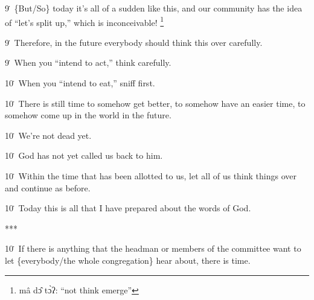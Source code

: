 9\. \{But/So\} today it's all of a sudden like this, and our community has the
idea of ``let's split up,'' which is inconceivable! \footnote{mâ dɔ̂ tɔ̀ʔ: ``not think emerge''}

9\. Therefore, in the future everybody should think this over carefully.

9\. When you ``intend to act,'' think carefully.

10\. When you ``intend to eat,'' sniff first.

10\. There is still time to somehow get better, to somehow have an easier time,
to somehow come up in the world in the future.

10\. We're not dead yet.

10\. God has not yet called us back to him.

10\. Within the time that has been allotted to us, let all of us think things over
and continue as before.

10\. Today this is all that I have prepared about the words of God.

***

10\. If there is anything that the headman or members of the committee want to
let \{everybody/the whole congregation\} hear about, there is time.

